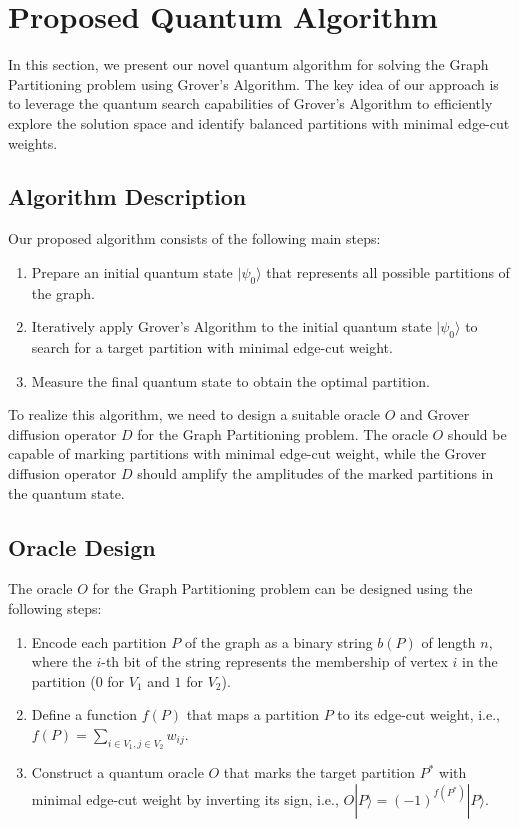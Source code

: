 \section{Proposed Quantum Algorithm}
\label{sec:algorithm}

In this section, we present our novel quantum algorithm for solving the Graph Partitioning problem using Grover's Algorithm. The key idea of our approach is to leverage the quantum search capabilities of Grover's Algorithm to efficiently explore the solution space and identify balanced partitions with minimal edge-cut weights.

\subsection{Algorithm Description}

Our proposed algorithm consists of the following main steps:

\begin{enumerate}
\item Prepare an initial quantum state $|\psi_0\rangle$ that represents all possible partitions of the graph.
\item Iteratively apply Grover's Algorithm to the initial quantum state $|\psi_0\rangle$ to search for a target partition with minimal edge-cut weight.
\item Measure the final quantum state to obtain the optimal partition.
\end{enumerate}

To realize this algorithm, we need to design a suitable oracle $O$ and Grover diffusion operator $D$ for the Graph Partitioning problem. The oracle $O$ should be capable of marking partitions with minimal edge-cut weight, while the Grover diffusion operator $D$ should amplify the amplitudes of the marked partitions in the quantum state.

\subsection{Oracle Design}

The oracle $O$ for the Graph Partitioning problem can be designed using the following steps:

\begin{enumerate}
\item Encode each partition $P$ of the graph as a binary string $b(P)$ of length $n$, where the $i$-th bit of the string represents the membership of vertex $i$ in the partition ($0$ for $V_1$ and $1$ for $V_2$).
\item Define a function $f(P)$ that maps a partition $P$ to its edge-cut weight, i.e., $f(P)=\sum_{i \in V_1, j \in V_2} w_{ij}$.
\item Construct a quantum oracle $O$ that marks the target partition $P^*$ with minimal edge-cut weight by inverting its sign, i.e., $O|P\rangle=(-1)^{f(P^*)}|P\rangle$.
\end{enumerate}

